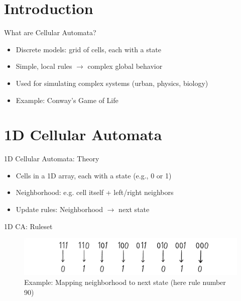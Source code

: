 \section{Introduction}
\begin{frame}{What are Cellular Automata?}
    \begin{itemize}
        \item Discrete models: grid of cells, each with a state
        \item Simple, local rules $\rightarrow$ complex global behavior
        \item Used for simulating complex systems (urban, physics, biology)
        \item Example: Conway's Game of Life
    \end{itemize}
\end{frame}


\section{1D Cellular Automata}
\begin{frame}{1D Cellular Automata: Theory}
    \begin{itemize}
        \item Cells in a 1D array, each with a state (e.g., 0 or 1)
        \item Neighborhood: e.g. cell itself + left/right neighbors
        \item Update rules: Neighborhood $\rightarrow$ next state
    \end{itemize}
\end{frame}

\begin{frame}{1D CA: Ruleset}
    \begin{figure}
        \centering
        \includegraphics[width=\textwidth]{../paper/figures/ruleset_example.png}
        \caption{Example: Mapping neighborhood to next state (here rule number 90)}
    \end{figure}
\end{frame}

